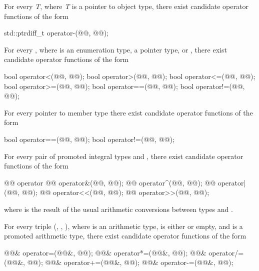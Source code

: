 \pnum
For every
\textit{T},
where
\textit{T}
is a pointer to object type,
there exist candidate operator functions of the form

\begin{codeblock}
std::ptrdiff_t   operator-(@@, @@);
\end{codeblock}

\pnum
For every , where  is an enumeration type, a pointer type, or
, there exist candidate operator functions of the form

\begin{codeblock}
bool    operator<(@@, @@);
bool    operator>(@@, @@);
bool    operator<=(@@, @@);
bool    operator>=(@@, @@);
bool    operator==(@@, @@);
bool    operator!=(@@, @@);
\end{codeblock}

\pnum
For every pointer to member type  there exist candidate operator functions of
the form

\begin{codeblock}
bool    operator==(@@, @@);
bool    operator!=(@@, @@);
\end{codeblock}

\pnum
For every pair of promoted integral types
and
,
there exist candidate operator functions of the form

\begin{codeblock}
@@      operator%
@@      operator&(@@, @@);
@@      operator^(@@, @@);
@@      operator|(@@, @@);
@@       operator<<(@@, @@);
@@       operator>>(@@, @@);
\end{codeblock}

where
is the result of the usual arithmetic conversions between types
and
.

\pnum
For every triple
(,
,
),
where
is an arithmetic type,
is either
or empty,
and
is a promoted arithmetic type,
there exist candidate operator functions of the form

\begin{codeblock}
@@&   operator=(@@&, @@);
@@&   operator*=(@@&, @@);
@@&   operator/=(@@&, @@);
@@&   operator+=(@@&, @@);
@@&   operator-=(@@&, @@);
\end{codeblock}

